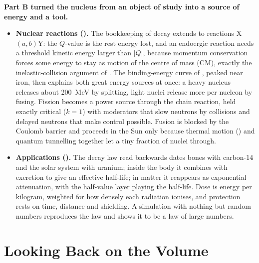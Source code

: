 \textbf{Part B turned the nucleus from an object of study into a source of energy and a tool.}
\begin{itemize}
\item \textbf{Nuclear reactions ().} The bookkeeping of decay extends to reactions
X$(a,b)$Y: the $Q$-value is the rest energy lost, and an endoergic reaction needs a threshold kinetic energy
larger than $|Q|$, because momentum conservation forces some energy to stay as motion of the centre of mass
(CM), exactly the inelastic-collision argument of . The binding-energy curve of
, peaked near iron, then explains both great energy sources at once: a heavy nucleus releases
about \SI{200}{\MeV} by splitting, light nuclei release more per nucleon by fusing. Fission becomes a power
source through the chain reaction, held exactly critical ($k=1$) with moderators that slow neutrons by
collisions and delayed neutrons that make control possible. Fusion is blocked by the Coulomb barrier and
proceeds in the Sun only because thermal motion () and quantum tunnelling together let a tiny
fraction of nuclei through.
\item \textbf{Applications ().} The decay law read backwards dates bones with carbon-14 and the
solar system with uranium; inside the body it combines with excretion to give an effective half-life; in matter
it reappears as exponential attenuation, with the half-value layer playing the half-life. Dose is energy per
kilogram, weighted for how densely each radiation ionises, and protection rests on time, distance and
shielding. A simulation with nothing but random numbers reproduces the law and shows it to be a law of large
numbers.
\end{itemize}

\section*{Looking Back on the Volume}

